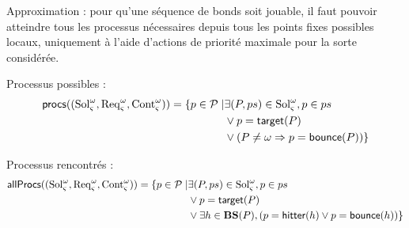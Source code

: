 

\newcommand{\abstr}[1]{#1^\wedge}%
\def\BS{\mathbf{BS}}
\def\procs{\mathsf{procs}}
\def\allprocs{\mathsf{allProcs}}
\def\pfp{\mathsf{pfp}}

\def\ctx{\varsigma}
\def\w{\omega}
\def\aBS{\abstr{\BS}}

\def\Req{\mathrm{Req}}
\def\Sol{\mathrm{Sol}}
\def\Cont{\mathrm{Cont}}
\def\A{\mathcal{A}}
\def\cwA{\A_\ctx^\w}
\def\cwReq{\Req_\ctx^\w}
\def\cwSol{\Sol_\ctx^\w}
\def\cwCont{\Cont_\ctx^\w}

\def\aB{\mathcal{B}}
\def\sat#1{\lceil #1\rceil}
\def\cwB{\sat{\aB_\ctx^\w}}
\def\mycwB#1#2{\sat{\aB_{#1}^{#2}}}
\def\Bsol{\sat{\Sol^\w_\ctx}}
\def\Breq{\sat{\Req^\w_\ctx}}
\def\Bcont{\sat{\Cont^\w_\ctx}}

\def\myB{\aB^\w_\ctx}
\def\mysol{\overline{\Sol^\w_\ctx}}
\def\myreq{\overline{\Req^\w_\ctx}}
\def\mycont{\overline{\Cont^\w_\ctx}}


\def\PHobjp#1#2#3{\PHobj{{#1}_{#2}}{{#1}_{#3}}}
\def\Obj{\mathbf{Obj}}
\def\powerset{\wp}
\def\gCont{\f{maxCont}}
\def\w{\omega}

Approximation : pour qu'une séquence de bonds soit jouable, il faut pouvoir atteindre tous les processus nécessaires depuis tous les points fixes possibles locaux, uniquement à l'aide d'actions de priorité maximale pour la sorte considérée.




Processus possibles :
\begin{align*}
\procs((\cwSol,\cwReq,\cwCont)) = \{ p \in \PHproc \mid & \exists (P,ps) \in \cwSol, p \in ps
\\ & \vee p = \PHtarget(P)
\\ & \vee (P \neq \omega \Rightarrow p = \PHbounce(P)) \}
\end{align*}

Processus rencontrés :
\begin{align*}
\allprocs((\cwSol,\cwReq,\cwCont)) = \{ p \in \PHproc \mid & \exists (P,ps) \in \cwSol, p \in ps
\\ & \vee p = \PHtarget(P)
\\ & \vee \exists h \in \BS(P), (p = \PHhitter(h) \vee p = \PHbounce(h)) \}
\end{align*}

